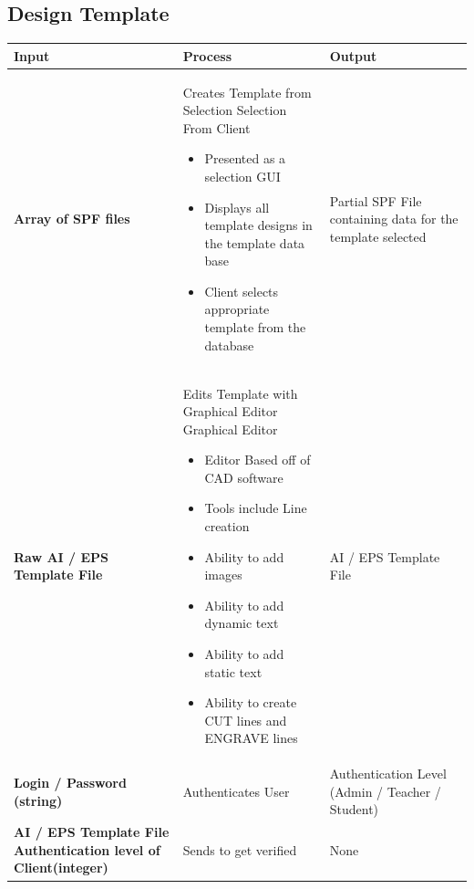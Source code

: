 \documentclass[oneside,openany,11pt,a4paper]{report}
\begin{document}
\subsection{Design Template}
\begin{longtable}{|p{3cm}|p{5cm}|p{4cm}|}	
	\hline
	\rowcolor{gray!40}
	\textbf{Input} & \textbf{Process}  & \textbf{Output} \\ \hline
	
	\rowcolor{white}
	\textbf{Array of SPF files} &  
	Creates Template from Selection \newline
	Selection From Client  \newline
	\begin{itemize}
		\itemsep0em
		\item Presented as a selection GUI
		\item Displays all template designs in the template data base
		\item Client selects appropriate template from the database
  \end{itemize}
	&  Partial SPF File containing data for the template selected \\ \hline
	
	
	
	\rowcolor{gray!25}
	\noindent \textbf{
		Raw AI / EPS Template File
	} &  Edits Template with Graphical Editor \newline
Graphical Editor
\begin{itemize}
	\itemsep0em
	\item Editor Based off of CAD software
	\item Tools include Line creation
	\item Ability to add images
	\item Ability to add dynamic text \footnotemark
	\item Ability to add static text \footnotemark
	\item Ability to create CUT lines and ENGRAVE lines
\end{itemize}
	&  AI / EPS Template File\\ \hline
	
	\rowcolor{white}
	\textbf{Login / Password (string)} &  
	Authenticates User
	&  Authentication Level (Admin / Teacher / Student) \\ \hline
	
	\rowcolor{gray!25}
	\textbf{AI / EPS Template File \newline
		Authentication level of Client(integer)} &  
	Sends to get verified
	& None \\ \hline
	
	
	
\end{longtable}
\end{document}
